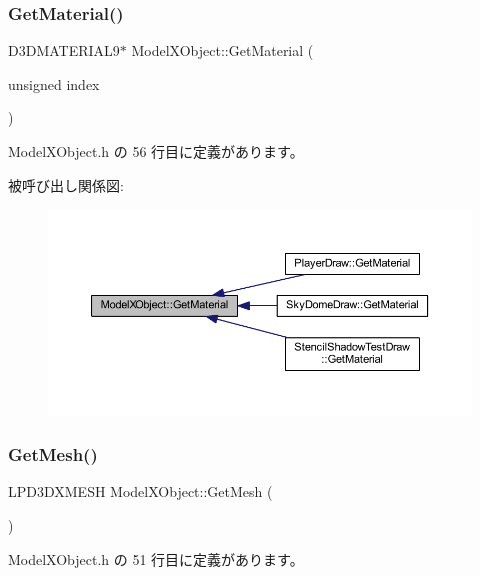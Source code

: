 \subsubsection{\texorpdfstring{Get\+Material()}{GetMaterial()}}
{\footnotesize\ttfamily D3\+D\+M\+A\+T\+E\+R\+I\+A\+L9$\ast$ Model\+X\+Object\+::\+Get\+Material (\begin{DoxyParamCaption}\item[{unsigned}]{index }\end{DoxyParamCaption})\hspace{0.3cm}{\ttfamily [inline]}}



 Model\+X\+Object.\+h の 56 行目に定義があります。

被呼び出し関係図\+:\nopagebreak
\begin{figure}[H]
\begin{center}
\leavevmode
\includegraphics[width=350pt]{class_model_x_object_a27df4304e87da11e2f9c9d7a8487a985_icgraph}
\end{center}
\end{figure}
\mbox{\label{class_model_x_object_a3aaab083fe6e1956b2eaab815ebb4bfb}} 
\subsubsection{\texorpdfstring{Get\+Mesh()}{GetMesh()}}
{\footnotesize\ttfamily L\+P\+D3\+D\+X\+M\+E\+SH Model\+X\+Object\+::\+Get\+Mesh (\begin{DoxyParamCaption}{ }\end{DoxyParamCaption})\hspace{0.3cm}{\ttfamily [inline]}}



 Model\+X\+Object.\+h の 51 行目に定義があります。

